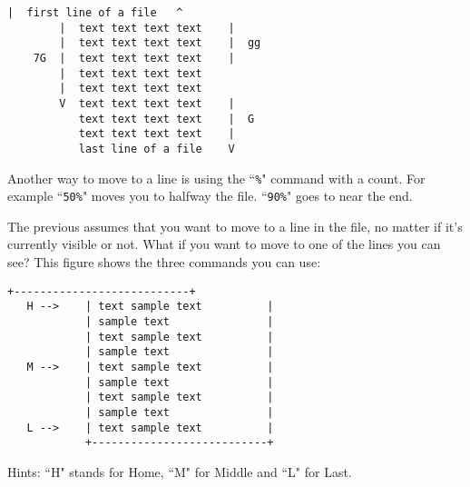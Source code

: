 \begin{Verbatim}[samepage=true]
        |  first line of a file   ^
        |  text text text text    |
        |  text text text text    |  gg
    7G  |  text text text text    |
        |  text text text text
        |  text text text text
        V  text text text text    |
           text text text text    |  G
           text text text text    |
           last line of a file    V
\end{Verbatim}

Another way to move to a line is using the ``\texttt{\%}" command with a count. 
For example ``\texttt{50\%}" moves you to halfway the file.
``\texttt{90\%}" goes to near the end.

The previous assumes that you want to move to a line in the file, no matter if it's currently visible or not.
What if you want to move to one of the lines you can see?
This figure shows the three commands you can use:

\begin{Verbatim}[samepage=true]
            +---------------------------+
   H -->    | text sample text          |
            | sample text               |
            | text sample text          |
            | sample text               |
   M -->    | text sample text          |
            | sample text               |
            | text sample text          |
            | sample text               |
   L -->    | text sample text          |
            +---------------------------+
\end{Verbatim}

Hints: ``H" stands for Home, ``M" for Middle and ``L" for Last.

